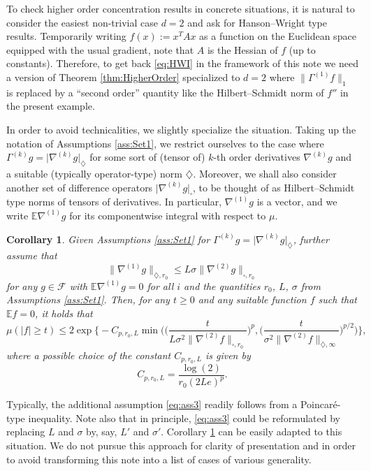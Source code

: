 \documentclass[a4paper,12pt]{amsart}
\numberwithin{equation}{section}
\newtheorem{korollar}[satz]{Corollary}
\theoremstyle{remark}
\def\E{{\mathbb E}}
\begin{document}
To check higher order concentration results in concrete situations, it is natural to consider the easiest non-trivial case $d=2$ and ask for Hanson--Wright type results. Temporarily writing $f(x) := x^TAx$ as a function on the Euclidean space equipped with the usual gradient, note that $A$ is the Hessian of $f$ (up to constants). Therefore, to get back \eqref{eq:HWI} in the framework of this note we need a version of Theorem \ref{thm:HigherOrder} specialized to $d=2$ where $\lVert \Gamma^{(1)} f \rVert_1$ is replaced by a ``second order'' quantity like the Hilbert--Schmidt norm of $f''$ in the present example.

In order to avoid technicalities, we slightly specialize the situation. Taking up the notation of Assumptions \ref{ass:Set1}, we restrict ourselves to the case where $\Gamma^{(k)} g = \lvert \nabla^{(k)} g \rvert_\diamondsuit$ for some sort of (tensor of) $k$-th order derivatives $\nabla^{(k)} g$ and a suitable (typically operator-type) norm $\diamondsuit$. Moreover, we shall also consider another set of difference operators $\lvert \nabla^{(k)} g \rvert_\square$, to be thought of as Hilbert--Schmidt type norms of tensors of derivatives. In particular, $\nabla^{(1)}g$ is a vector, and we write $\E \nabla^{(1)}g$ for its componentwise integral with respect to $\mu$.

\begin{korollar}\label{cor:HWI}
Given Assumptions \ref{ass:Set1} for $\Gamma^{(k)} g = \lvert \nabla^{(k)} g \rvert_\diamondsuit$, further assume that
\begin{equation}\label{eq:ass3}
\lVert \nabla^{(1)} g \rVert_{\diamondsuit, r_0} \le L\sigma \lVert \nabla^{(2)} g \rVert_{\square, r_0}
\end{equation}
for any $g \in \mathcal{F}$ with $\E\nabla^{(1)}g = 0$ for all $i$ and the quantities $r_0$, $L$, $\sigma$ from Assumptions \ref{ass:Set1}. Then, for any $t\ge 0$ and any suitable function $f$ such that $\E f = 0$, it holds that
        \[
        \mu(|f| \ge t)\le
        2 \exp\Big\{- C_{p,r_0,L} \min\Big(\Big(\frac{t}{L\sigma^2 \lVert \nabla^{(2)} f \rVert_{\square, r_0}}\Big)^p, \Big(\frac{t}{\sigma^2\lVert \nabla^{(2)} f \rVert_{\diamondsuit,\infty}}\Big)^{p/2}\Big)\Big\},
        \]
    where a possible choice of the constant $C_{p,r_0,L}$ is given by
    \[
    C_{p,r_0,L} = \frac{\log(2)}{r_0(2Le)^p}.
    \]
\end{korollar}

Typically, the additional assumption \eqref{eq:ass3} readily follows from a Poincar\'{e}-type inequality. Note also that in principle, \eqref{eq:ass3} could be reformulated by replacing $L$ and $\sigma$ by, say, $L'$ and $\sigma'$. Corollary \ref{cor:HWI} can be easily adapted to this situation. We do not pursue this approach for clarity of presentation and in order to avoid transforming this note into a list of cases of various generality.
\end{document}

